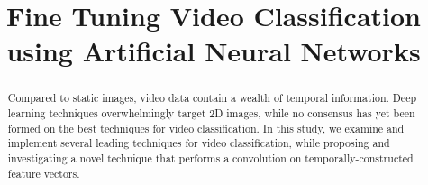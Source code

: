 \documentclass[conference]{IEEEtran}
\begin{document}
\title{Fine Tuning Video Classification using Artificial Neural Networks}
\author{
}
\maketitle
\begin{abstract}
Compared to static images, video data contain a wealth of temporal information.
Deep learning techniques overwhelmingly target 2D images, while no consensus has yet been formed on the best techniques for video classification. In this study, we examine and implement several leading techniques for video classification, while proposing and investigating a novel technique that performs a convolution on temporally-constructed feature vectors.
\end{abstract}



\end{document}

